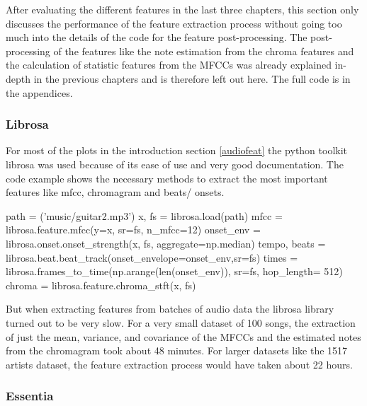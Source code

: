 After evaluating the different features in the last three chapters, this section only discusses the performance of the feature extraction process without going too much into the details of the code for the feature post-processing. The post-processing of the features like the note estimation from the chroma features and the calculation of statistic features from the MFCCs was already explained in-depth in the previous chapters and is therefore left out here. The full code is in the appendices. 

\subsubsection{Librosa}

For most of the plots in the introduction section \ref{audiofeat} the python toolkit librosa was used because of its ease of use and very good documentation. The code example shows the necessary methods to extract the most important features like mfcc, chromagram and beats/ onsets.
\lstset{language=Python} 
\begin{pythonCode}[frame=single,label={lst:librosa},caption={librosa},captionpos=b]
path = ('music/guitar2.mp3')
x, fs = librosa.load(path)
mfcc = librosa.feature.mfcc(y=x, sr=fs, n_mfcc=12)
onset_env = librosa.onset.onset_strength(x, fs, aggregate=np.median)
tempo, beats = librosa.beat.beat_track(onset_envelope=onset_env,sr=fs)
times = librosa.frames_to_time(np.arange(len(onset_env)), sr=fs, hop_length= 512)
chroma = librosa.feature.chroma_stft(x, fs)
\end{pythonCode}	
But when extracting features from batches of audio data the librosa library turned out to be very slow. For a very small dataset of 100 songs, the extraction of just the mean, variance, and covariance of the MFCCs and the estimated notes from the chromagram took about 48 minutes. 
For larger datasets like the 1517 artists dataset, the feature extraction process would have taken about 22 hours. 

\subsubsection{Essentia}

